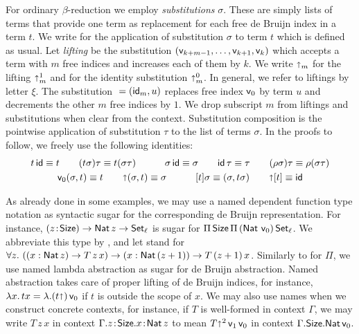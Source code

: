 \documentclass[acmsmall,screen]{acmart}\settopmatter{}
\begin{document}
For ordinary $\beta$-reduction we employ \emph{substitutions}
$\sigma$.  These are simply lists of terms that provide one term as
replacement for each free de Bruijn index in a term $t$. We write
 for the application of substitution $\sigma$ to term
$t$ which is defined as usual.  Let \emph{lifting} 
be the substitution $(\ind{k+m-1},\dots,\ind{k+1},\ind k)$ which
accepts a term with $m$ free indices and increases each of them by
$k$.  We write $\slift_m$ for the lifting $\slift^1_m$ and
 for the identity substitution $ \slift^0_m$. In
general, we refer to liftings by letter $\xi$.
%
The substitution ${} = (\sid_m, u)$ replaces free index
$\ind 0$ by term $u$ and decrements the other $m$ free indices by
$1$. We drop subscript $m$ from liftings and substitutions when clear from the context.
%
Substitution composition \fbox{$\sigma\tau$} is the pointwise
application of substitution $\tau$ to the list of terms $\sigma$.  In
the proofs to follow, we freely use the following identities:
\begin{gather*}
  t\,\sid \equiv t
\qquad
  (t\sigma)\tau \equiv t(\sigma\tau)
\qquad\quad
  \sigma\, \sid \equiv \sigma
\qquad
  \sid\, \tau \equiv \tau
\qquad
  (\rho\sigma)\tau \equiv \rho(\sigma\tau)
\\
  \ind 0 (\sigma,t) \equiv t
\qquad
  \slift(\sigma,t) \equiv \sigma
\qquad\quad
  [t]\sigma \equiv (\sigma, t\sigma)
\qquad
  \slift[t] \equiv \sid
\end{gather*}

As already done in some examples, we may use a named dependent
function type notation as syntactic sugar for the corresponding de
Bruijn representation.  For instance,
$\funT z \Size \Nat z \to \Set[\ell]$ is sugar for
$\piT \Size \piT {(\Nat\,\ind 0)} \Set[\ell]$.  We abbreviate this
type by \fbox{$\FixK\,\ell$}, and let  stand for
$\forall z.\ (\sfunT x {\Nat z} T\, z\, x) \to \sfunT x {\Nat (z + 1)} T \,(z+1)\, x$.
%
Similarly to for $\Pi$, we use named lambda abstraction as sugar for de
Bruijn abstraction.  Named abstraction takes care of proper lifting of
de Bruijn indices, for instance,
$\lambda x.\, t x = \lambda. (t \slift)\,\ind 0$ if $t$ is outside the
scope of $x$.
%
We may also use names when we construct concrete contexts, for
instance, if\/ $T$ is well-formed in context $\Gamma$, we may write
$T\,z\,x$ in context $\Gamma.z\of\Size.x\of\Nat z$ to mean
$T\slift^2\,\ind 1\,\ind 0$ in context $\Gamma.\Size.\Nat \ind 0$.
\end{document}

